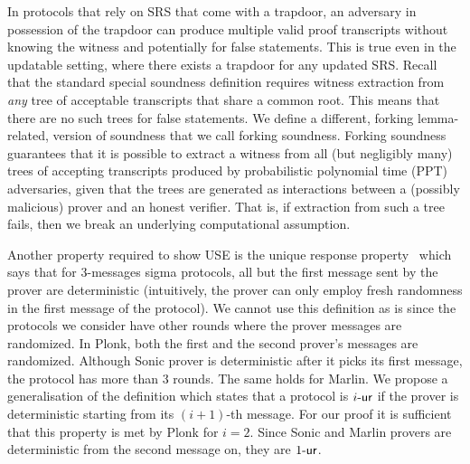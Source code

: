 In protocols that rely on SRS that come with a trapdoor, an adversary in possession of the
trapdoor can produce multiple valid proof transcripts without knowing the witness and
potentially for false statements. This is true even in the updatable setting, where there
exists a trapdoor for any updated SRS.  Recall that the standard special soundness definition
requires witness extraction from \emph{any} tree of acceptable transcripts that share a common
root. This means that there are no such trees for false statements. We define a different,
forking lemma-related, version of soundness that we call forking soundness. Forking soundness
guarantees that it is possible to extract a witness from all (but negligibly many) trees of
accepting transcripts produced by probabilistic polynomial time (PPT) adversaries, given that
the trees are generated as interactions between a (possibly malicious) prover and an honest
verifier. That is, if extraction from such a tree fails, then we break an underlying
computational assumption.

  Another property required to
show USE is the unique response property~\cite{C:Fischlin05} which says that for $3$-messages
sigma protocols, all but the first message sent by the prover are deterministic (intuitively,
the prover can only employ fresh randomness in the first message of the protocol). We cannot
use this definition as is since the protocols we consider have other rounds where the prover
messages are randomized. In Plonk, both the first and the second prover's messages are
randomized. Although Sonic prover is deterministic after it picks its first message, the
protocol has more than $3$ rounds. The same holds for Marlin. We propose a generalisation of
the definition which states that a protocol is ${i\text{-}\mathsf{ur}}$ if the prover is deterministic starting
from its $(i + 1)$-th message. For our proof it is sufficient that this property is met by
Plonk for $i = 2$. Since Sonic and Marlin provers are deterministic from the second message on,
they are ${1\text{-}\mathsf{ur}}$.


